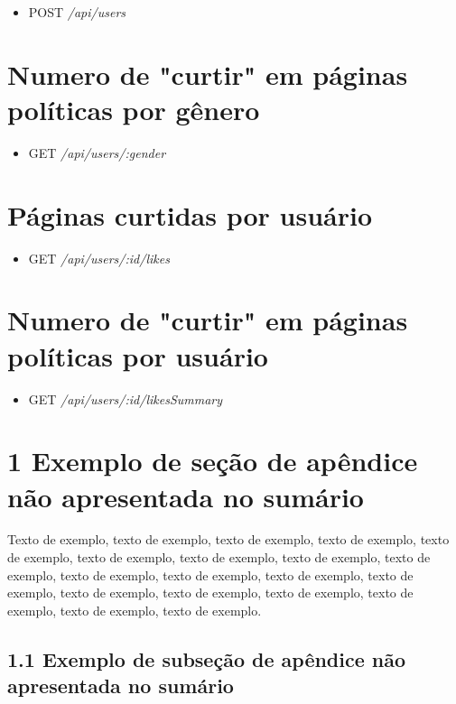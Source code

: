 \documentclass[
	12pt,				%
	oneside,			%
	a4paper,			%
	english,			%
	brazil				%
	]{abntex2ppgsi}
\begin{document}
\begin{apendicesenv}
\begin{itemize}
	\item {POST} \textit{/api/users}
\end{itemize}

\section{Numero de "curtir" em páginas políticas por gênero}

\begin{itemize}
	\item {GET} \textit{/api/users/:gender}
\end{itemize}

\section{Páginas curtidas por usuário}

\begin{itemize}
	\item {GET} \textit{/api/users/:id/likes}
\end{itemize}

\section{Numero de "curtir" em páginas políticas por usuário}

\begin{itemize}
	\item {GET} \textit{/api/users/:id/likesSummary}
\end{itemize}

\section*{1 Exemplo de seção de apêndice não apresentada no sumário}

Texto de exemplo, texto de exemplo, texto de exemplo, texto de exemplo, texto de exemplo, texto de exemplo, texto de exemplo, texto de exemplo, texto de exemplo, texto de exemplo, texto de exemplo, texto de exemplo, texto de exemplo, texto de exemplo, texto de exemplo, texto de exemplo, texto de exemplo, texto de exemplo, texto de exemplo.

\subsection*{1.1 Exemplo de subseção de apêndice não apresentada no sumário}


\end{apendicesenv}
\end{document}
